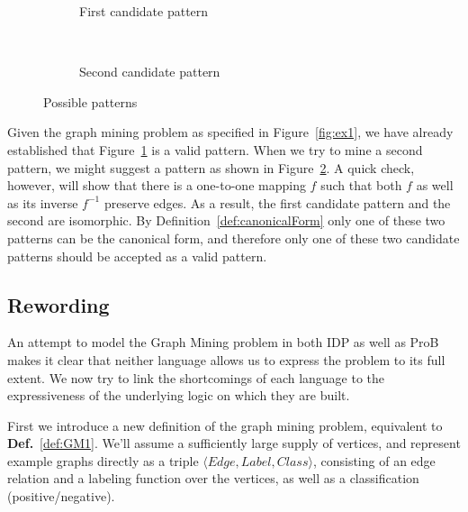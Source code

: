 \documentclass{article}
\theoremstyle{definition}
\newcommand{\triple}[1]{\ensuremath{\langle #1 \rangle}}
\begin{document}
\begin{figure}[h]
\centering
\begin{subfigure}[b]{0.45\textwidth}
    \centering
    \caption{First candidate pattern\label{fig:iso1}}
\end{subfigure}
~
\begin{subfigure}[b]{0.45\textwidth}
    \centering
    \caption{Second candidate pattern\label{fig:iso2}}
\end{subfigure}
\caption{Possible patterns\label{fig:isomorphism}}
\end{figure}

Given the graph mining problem as specified in Figure~\ref{fig:ex1}, we have already established that Figure~\ref{fig:iso1} is a valid pattern.
When we try to mine a second pattern, we might suggest a pattern as shown in Figure~\ref{fig:iso2}.
A quick check, however, will show that there is a one-to-one mapping $f$ such that both $f$ as well as its inverse $f^{-1}$ preserve edges.
As a result, the first candidate pattern and the second are isomorphic.
By Definition~\ref{def:canonicalForm} only one of these two patterns can be the canonical form, and therefore only one of these two candidate patterns should be accepted as a valid pattern.

\subsection{Rewording}

An attempt to model the Graph Mining problem in both IDP as well as ProB makes it clear
that neither language allows us to express the problem to its full extent.
We now try to link the shortcomings of each language to the expressiveness of the underlying logic on which they are built.

First we introduce a new definition of the graph mining problem, equivalent to \textbf{Def.}~\ref{def:GM1}.
We'll assume a sufficiently large supply of vertices, and represent example graphs directly as a triple $\triple{Edge, Label, Class}$, consisting of an edge relation and a labeling function over the vertices, as well as a classification (positive/negative).
\end{document}
